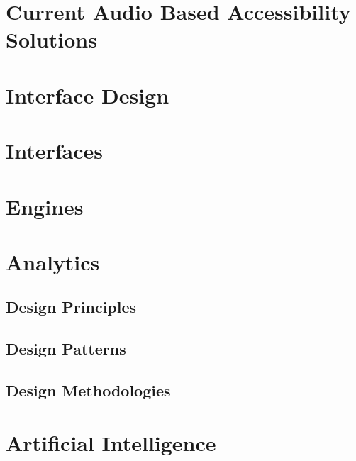 \section{                  Current Audio Based Accessibility Solutions        }






\section{                  Interface Design                                   }






\section{                  Interfaces                                         }






\section{                  Engines                                            }








\section{                  Analytics                                          }
\subsection{                  Design Principles                               }
\subsection{                  Design Patterns                                 }
\subsection{                  Design Methodologies                            }
\section{                  Artificial Intelligence                            }
